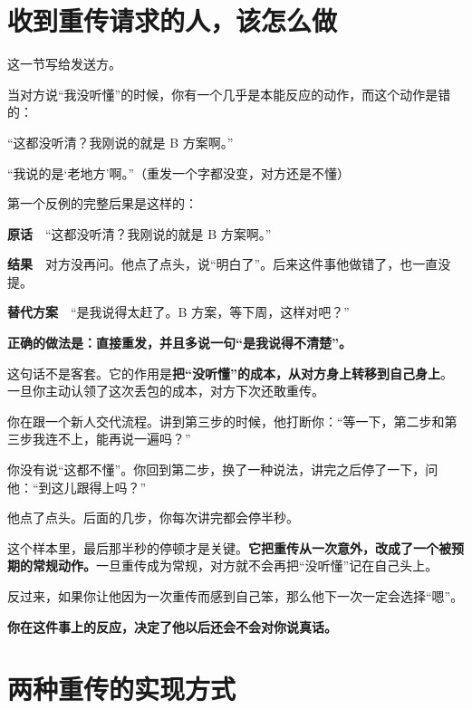 \section{收到重传请求的人，该怎么做}

这一节写给发送方。

当对方说“我没听懂”的时候，你有一个几乎是本能反应的动作，而这个动作是错的：

\begin{mdquote}
\hspace{0.5em}“这都没听清？我刚说的就是 B 方案啊。”

\hspace{0.5em}“我说的是‘老地方’啊。”（重发一个字都没变，对方还是不懂）
\end{mdquote}

第一个反例的完整后果是这样的：

\begin{mdquote}
\textbf{原话}　“这都没听清？我刚说的就是 B 方案啊。”

\textbf{结果}　对方没再问。他点了点头，说“明白了”。后来这件事他做错了，也一直没提。

\textbf{替代方案}　“是我说得太赶了。B 方案，等下周，这样对吧？”
\end{mdquote}

\textbf{正确的做法是：直接重发，并且多说一句“是我说得不清楚”。}

这句话不是客套。它的作用是\textbf{把“没听懂”的成本，从对方身上转移到自己身上}。一旦你主动认领了这次丢包的成本，对方下次还敢重传。

\par
\begin{mdquote}
你在跟一个新人交代流程。讲到第三步的时候，他打断你：“等一下，第二步和第三步我连不上，能再说一遍吗？”

你没有说“这都不懂”。你回到第二步，换了一种说法，讲完之后停了一下，问他：“到这儿跟得上吗？”

他点了点头。后面的几步，你每次讲完都会停半秒。
\end{mdquote}

这个样本里，最后那半秒的停顿才是关键。\textbf{它把重传从一次意外，改成了一个被预期的常规动作。}一旦重传成为常规，对方就不会再把“没听懂”记在自己头上。

反过来，如果你让他因为一次重传而感到自己笨，那么他下一次一定会选择“嗯”。

\textbf{你在这件事上的反应，决定了他以后还会不会对你说真话。}

\section{两种重传的实现方式}

